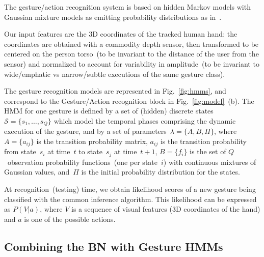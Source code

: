 The gesture/action recognition system is based on hidden Markov models with Gaussian mixture models as emitting probability distributions as in~\cite{saponaro:2013:crhri}.

Our input features are the 3D coordinates of the tracked human hand: the coordinates are obtained with a commodity depth sensor, then transformed to be centered on the person torso~(to be invariant to the distance of the user from the sensor) and normalized to account for variability in amplitude~(to be invariant to wide/emphatic vs narrow/subtle executions of the same gesture class).

The gesture recognition models are represented in Fig.~\ref{fig:hmms}, and correspond to the Gesture/Action recognition block in Fig.~\ref{fig:model}~(b).
The \ac{HMM} for one gesture is defined by a set of (hidden) discrete states~$\mathcal{S} = \{s_1, \dots, s_Q\}$ which model the temporal phases comprising the dynamic execution of the gesture, and by a set of parameters~$\lambda = \{ A, B, \Pi \}$, where~$A = \{ a_{ij} \}$ is the transition probability matrix, $a_{ij}$ is the transition probability from state~$s_i$ at time~$t$ to state~$s_j$ at time~$t+1$, $B = \{ f_i \}$ is the set of $Q$~observation probability functions~(one per state~$i$) with continuous mixtures of Gaussian values, and~$\Pi$ is the initial probability distribution for the states.

At recognition~(testing) time, we obtain likelihood scores of a new gesture being classified with the common \FB{} inference algorithm.
This likelihood can be expressed as $P(V|a)$, where $V$ is a sequence of visual features (3D coordinates of the hand) and $a$ is one of the possible actions.


\subsection{Combining the \acs{BN} with Gesture \acsp{HMM}}
\label{sec:combination}

